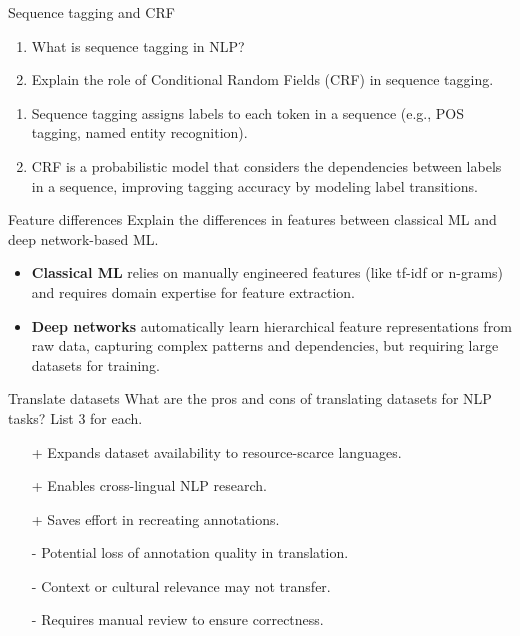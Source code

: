 \documentclass{article}
\begin{document}
\begin{exercise}{Sequence tagging and CRF}\label{ex:seq-tagging}
  \begin{enumerate}
    \item What is sequence tagging in NLP?
    \item Explain the role of Conditional Random Fields (CRF) in sequence tagging.
  \end{enumerate}

  \begin{solution}
    \begin{enumerate}
        \item Sequence tagging assigns labels to each token in a sequence (e.g., POS tagging, named entity recognition).
        \item CRF is a probabilistic model that considers the dependencies between labels in a sequence, improving tagging accuracy by modeling label transitions.
    \end{enumerate}
  \end{solution}
\end{exercise}

\begin{exercise}{Feature differences}
  Explain the differences in features between classical ML and deep network-based ML.

  \begin{solution}
    \begin{itemize}
        \item \textbf{Classical ML} relies on manually engineered features (like tf-idf or n-grams) and requires domain expertise for feature extraction.
        \item \textbf{Deep networks} automatically learn hierarchical feature representations from raw data, capturing complex patterns and dependencies, but requiring large datasets for training.
    \end{itemize}
  \end{solution}
\end{exercise}

\begin{exercise}{Translate datasets}
  What are the pros and cons of translating datasets for NLP tasks? List 3 for each.

  \begin{solution}
    \begin{itemize}
        \item[+] Expands dataset availability to resource-scarce languages.
        \item[+] Enables cross-lingual NLP research.
        \item[+] Saves effort in recreating annotations.
        \item[-] Potential loss of annotation quality in translation.
        \item[-] Context or cultural relevance may not transfer.
        \item[-] Requires manual review to ensure correctness.
    \end{itemize}
  \end{solution}
\end{exercise}
\end{document}

